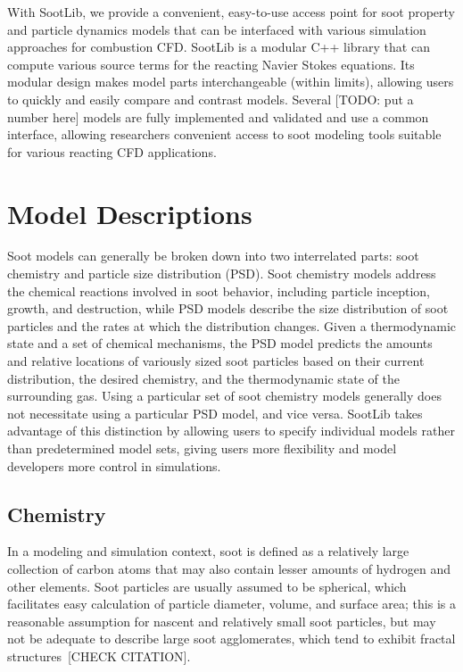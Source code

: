 \documentclass[preprint,letterpaper]{elsarticle}
\begin{document}
With SootLib, we provide a convenient, easy-to-use access point for soot property and particle dynamics models that can be interfaced with various simulation approaches for combustion CFD. SootLib is a modular C++ library that can compute various source terms for the reacting Navier Stokes equations. Its modular design makes model parts interchangeable (within limits), allowing users to quickly and easily compare and contrast models. Several [TODO: put a number here] models are fully implemented and validated and use a common interface, allowing researchers convenient access to soot modeling tools suitable for various reacting CFD applications.


\section{Model Descriptions}
\label{s:models}

Soot models can generally be broken down into two interrelated parts: soot chemistry and particle size distribution (PSD). Soot chemistry models address the chemical reactions involved in soot behavior, including particle inception, growth, and destruction, while PSD models describe the size distribution of soot particles and the rates at which the distribution changes. Given a thermodynamic state and a set of chemical mechanisms, the PSD model predicts the amounts and relative locations of variously sized soot particles based on their current distribution, the desired chemistry, and the thermodynamic state of the surrounding gas. Using a particular set of soot chemistry models generally does not necessitate using a particular PSD model, and vice versa. SootLib takes advantage of this distinction by allowing users to specify individual models rather than predetermined model sets, giving users more flexibility and model developers more control in simulations.

\subsection{Chemistry}
\label{ss:chemistry}

In a modeling and simulation context, soot is defined as a relatively large collection of carbon atoms that may also contain lesser amounts of hydrogen and other elements. Soot particles are usually assumed to be spherical, which facilitates easy calculation of particle diameter, volume, and surface area; this is a reasonable assumption for nascent and relatively small soot particles, but may not be adequate to describe large soot agglomerates, which tend to exhibit fractal structures~\cite{Jullien_1987}[CHECK CITATION].
\end{document}
